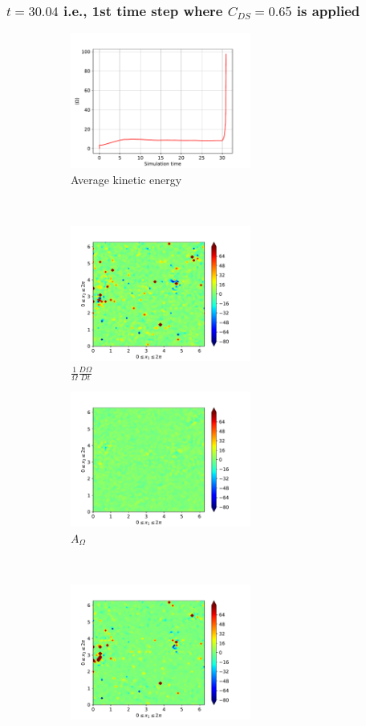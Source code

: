 \subsubsection{$t=30.04$ i.e., 1st time step where $C_{DS}=0.65$ is applied} 
\begin{figure}[H]
    \begin{subfigure}[H]{0.45\textwidth}
        \includegraphics[height=1.75in]{media/run-cds-65/enst-average1440}
        \caption{Average kinetic energy}
    \end{subfigure}
    ~
    \begin{subfigure}[H]{0.45\textwidth}
        \includegraphics[height=1.75in]{media/run-cds-65/enst-1440}
        \caption{$\frac{1}{\Omega} \frac{D \Omega}{Dt}$}
    \end{subfigure}
    \newline
    \begin{subfigure}{0.45\textwidth}
        \includegraphics[height=1.75in]{media/run-cds-65/A-enst-1440}
        \caption{$A_{\Omega}$}
    \end{subfigure}
    ~
    \begin{subfigure}{0.45\textwidth}
        \includegraphics[height=1.75in]{media/run-cds-65/Pi-enst-1440}

\end{subfigure}
\end{figure}
